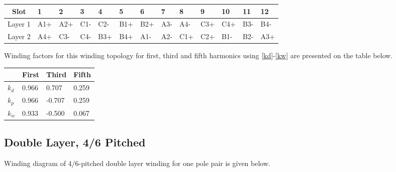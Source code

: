\documentclass{reportClass}
\begin{document}
\begin{table}[h!] \centering
\begin{tabular}{|c|l|l|l|l|l|l|l|l|l|l|l|l|}
\hline
Slot    & 1                           & 2                           & 3                           & 4                           & 5                           & 6                           & 7                           & 8                           & 9                           & 10                          & 11                          & 12                          \\ \hline
Layer 1 & \cellcolor[HTML]{FCFF2F}A1+ & \cellcolor[HTML]{FCFF2F}A2+ & \cellcolor[HTML]{CBCEFB}C1- & \cellcolor[HTML]{CBCEFB}C2- & \cellcolor[HTML]{90E3FB}B1+ & \cellcolor[HTML]{90E3FB}B2+ & \cellcolor[HTML]{FCFF2F}A3- & \cellcolor[HTML]{FCFF2F}A4- & \cellcolor[HTML]{CBCEFB}C3+ & \cellcolor[HTML]{CBCEFB}C4+ & \cellcolor[HTML]{90E3FB}B3- & \cellcolor[HTML]{90E3FB}B4- \\ \hline
Layer 2 & \cellcolor[HTML]{FCFF2F}A4+ & \cellcolor[HTML]{CBCEFB}C3- & \cellcolor[HTML]{CBCEFB}C4- & \cellcolor[HTML]{90E3FB}B3+ & \cellcolor[HTML]{90E3FB}B4+ & \cellcolor[HTML]{FCFF2F}A1- & \cellcolor[HTML]{FCFF2F}A2- & \cellcolor[HTML]{CBCEFB}C1+ & \cellcolor[HTML]{CBCEFB}C2+ & \cellcolor[HTML]{90E3FB}B1- & \cellcolor[HTML]{90E3FB}B2- & \cellcolor[HTML]{FCFF2F}A3+ \\ \hline
\end{tabular}
\end{table}


Winding factors for this winding topology for first, third and fifth harmonics using \ref{kd}-\ref{kw} are presented on the table below.

\begin{table}[h!] \centering
\begin{tabular}{|l|l|l|l|}
\hline
   & First & Third  & Fifth \\ \hline
$k_d$ & 0.966 & 0.707  & 0.259 \\ \hline
$k_p$ & 0.966 & -0.707 & 0.259 \\ \hline
$k_w$ & 0.933 & -0.500 & 0.067 \\ \hline
\end{tabular}
\end{table}


\subsection{Double Layer, 4/6 Pitched}

Winding diagram of 4/6-pitched double layer winding for one pole pair is given below.
\end{document}
